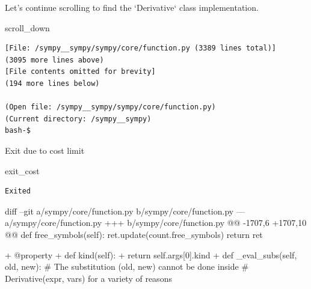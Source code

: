 {\begin{agentbox}
Let's continue scrolling to find the `Derivative` class implementation.



\hrulefill
\begin{CodeVerbatim}[breaklines=true, breakanywhere=true]
scroll_down
\end{CodeVerbatim}
\end{agentbox}
\begin{observationbox}\begin{Verbatim}[breaklines=true, breakanywhere=true]
[File: /sympy__sympy/sympy/core/function.py (3389 lines total)]
(3095 more lines above)
[File contents omitted for brevity]
(194 more lines below)

(Open file: /sympy__sympy/sympy/core/function.py)
(Current directory: /sympy__sympy)
bash-$
\end{Verbatim}
\end{observationbox}
\begin{agentbox}
Exit due to cost limit

\hrulefill
\begin{CodeVerbatim}[breaklines=true, breakanywhere=true]
exit_cost
\end{CodeVerbatim}
\end{agentbox}
\begin{observationbox}\begin{Verbatim}[breaklines=true, breakanywhere=true]
Exited
\end{Verbatim}
\end{observationbox}
\begin{goldpatchbox}
\begin{CodeVerbatim}[breaklines=true, breakanywhere=true]
diff --git a/sympy/core/function.py b/sympy/core/function.py
--- a/sympy/core/function.py
+++ b/sympy/core/function.py
@@ -1707,6 +1707,10 @@ def free_symbols(self):
             ret.update(count.free_symbols)
         return ret
 
+    @property
+    def kind(self):
+        return self.args[0].kind
+
     def _eval_subs(self, old, new):
         # The substitution (old, new) cannot be done inside
         # Derivative(expr, vars) for a variety of reasons
\end{CodeVerbatim}
\end{goldpatchbox}
}